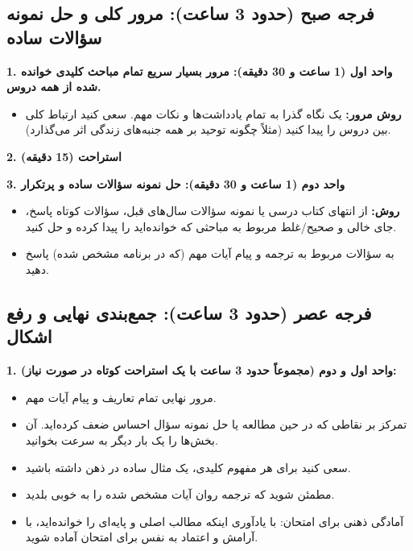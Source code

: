 \documentclass[12pt,a4paper]{article}
\newcommand{\sectionbreak}{\noindent\hrulefill\par\vspace{0.5em}}
\begin{document}
\subsection*{فرجه صبح (حدود 3 ساعت): مرور کلی و حل نمونه سؤالات ساده}

\textbf{1. واحد اول (1 ساعت و 30 دقیقه): مرور بسیار سریع تمام مباحث کلیدی خوانده شده از همه دروس.}
\begin{itemize}
    \item \textbf{روش مرور:} یک نگاه گذرا به تمام یادداشت‌ها و نکات مهم. سعی کنید ارتباط کلی بین دروس را پیدا کنید (مثلاً چگونه توحید بر همه جنبه‌های زندگی اثر می‌گذارد).
\end{itemize}

\textbf{2. استراحت (15 دقیقه)}
\vspace{0.5em}

\textbf{3. واحد دوم (1 ساعت و 30 دقیقه): حل نمونه سؤالات ساده و پرتکرار}
\begin{itemize}
    \item \textbf{روش:} از انتهای کتاب درسی یا نمونه سؤالات سال‌های قبل، سؤالات کوتاه پاسخ، جای خالی و صحیح/غلط مربوط به مباحثی که خوانده‌اید را پیدا کرده و حل کنید.
    \item به سؤالات مربوط به ترجمه و پیام آیات مهم (که در برنامه مشخص شده) پاسخ دهید.
\end{itemize}

\sectionbreak
\vspace{1em}

\subsection*{فرجه عصر (حدود 3 ساعت): جمع‌بندی نهایی و رفع اشکال}

\textbf{1. واحد اول و دوم (مجموعاً حدود 3 ساعت با یک استراحت کوتاه در صورت نیاز):}
\begin{itemize}
    \item مرور نهایی تمام تعاریف و پیام آیات مهم.
    \item تمرکز بر نقاطی که در حین مطالعه یا حل نمونه سؤال احساس ضعف کرده‌اید. آن بخش‌ها را یک بار دیگر به سرعت بخوانید.
    \item سعی کنید برای هر مفهوم کلیدی، یک مثال ساده در ذهن داشته باشید.
    \item مطمئن شوید که ترجمه روان آیات مشخص شده را به خوبی بلدید.
    \item آمادگی ذهنی برای امتحان: با یادآوری اینکه مطالب اصلی و پایه‌ای را خوانده‌اید، با آرامش و اعتماد به نفس برای امتحان آماده شوید.
\end{itemize}
\end{document}
